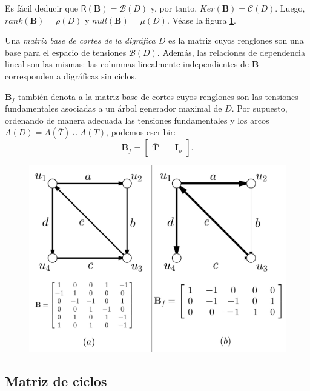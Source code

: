 Es fácil deducir que  $\mathsf{R}(\mathbf{B}) =\mathcal{B}(D)$ y, por tanto, $Ker(\mathbf{B}) = \mathcal{C}(D)$. Luego, $rank(\mathbf{B}) = \rho(D)$ y $null(\mathbf{B}) = \mu(D)$. Véase la figura \ref{fig:matrizdecortesdirigidos}.

Una \textit{matriz base de cortes de la digráfica $D$} es la matriz cuyos renglones son una base para el espacio de tensiones $\mathcal{B}(D)$. Además, las relaciones de dependencia lineal son las mismas: las columnas linealmente independientes de $\mathbf{B}$ corresponden a digráficas sin ciclos.

$\mathbf{B}_{f}$ también denota a la matriz base de cortes cuyos renglones son las tensiones fundamentales asociadas a un árbol generador maximal de $D$. Por supuesto, ordenando de manera adecuada las tensiones fundamentales y los arcos $A(D) = A(\overline{T}) \cup A(T)$, podemos escribir:
$$
\mathbf{B}_{f} = \begin{bmatrix}
\mathbf{\overline{T}}& | & \mathbf{I}_{\rho}
\end{bmatrix}.
$$

\begin{figure}[H]
    \centering
    \includegraphics[scale=0.25]{img/imgchapter4/matrizdecortesdirigidos.jpg}
    \caption{}
    \label{fig:matrizdecortesdirigidos}
\end{figure}

\subsection{Matriz de ciclos}

